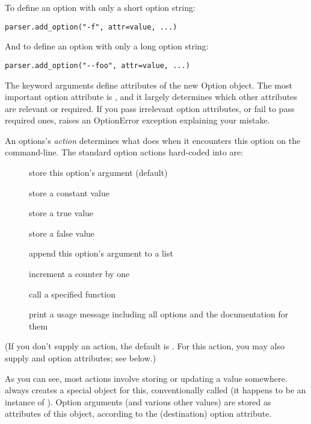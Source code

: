 To define an option with only a short option string:
\begin{verbatim}
parser.add_option("-f", attr=value, ...)
\end{verbatim}

And to define an option with only a long option string:
\begin{verbatim}
parser.add_option("--foo", attr=value, ...)
\end{verbatim}

The keyword arguments define attributes of the new Option object.  The
most important option attribute is , and it largely determines
which other attributes are relevant or required.  If you pass irrelevant
option attributes, or fail to pass required ones,  raises an
OptionError exception explaining your mistake.

An options's \emph{action} determines what  does when it encounters this
option on the command-line.  The standard option actions hard-coded into
 are:
\begin{description}
\item[]
store this option's argument (default)
\item[]
store a constant value
\item[]
store a true value
\item[]
store a false value
\item[]
append this option's argument to a list
\item[]
increment a counter by one
\item[]
call a specified function
\item[]
print a usage message including all options and the
documentation for them
\end{description}

(If you don't supply an action, the default is .  For this
action, you may also supply  and  option attributes; see
below.)

As you can see, most actions involve storing or updating a value
somewhere.   always creates a special object for this,
conventionally called  (it happens to be an instance of
).  Option arguments (and various other values) are
stored as attributes of this object, according to the 
(destination) option attribute.

